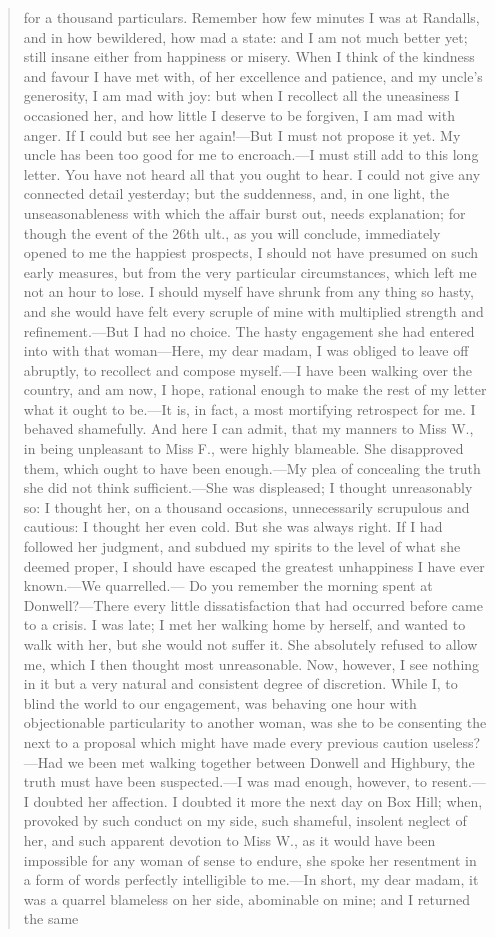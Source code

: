 \begin{quotation}
for a thousand particulars. Remember how few minutes I was at Randalls, and in how bewildered, how mad a state: and I am not much better yet; still insane either from happiness or misery. When I think of the kindness and favour I have met with, of her excellence and patience, and my uncle's generosity, I am mad with joy: but when I recollect all the uneasiness I occasioned her, and how little I deserve to be forgiven, I am mad with anger. If I could but see her again!—But I must not propose it yet. My uncle has been too good for me to encroach.—I must still add to this long letter. You have not heard all that you ought to hear. I could not give any connected detail yesterday; but the suddenness, and, in one light, the unseasonableness with which the affair burst out, needs explanation; for though the event of the 26th ult., as you will conclude, immediately opened to me the happiest prospects, I should not have presumed on such early measures, but from the very particular circumstances, which left me not an hour to lose. I should myself have shrunk from any thing so hasty, and she would have felt every scruple of mine with multiplied strength and refinement.—But I had no choice. The hasty engagement she had entered into with that woman—Here, my dear madam, I was obliged to leave off abruptly, to recollect and compose myself.—I have been walking over the country, and am now, I hope, rational enough to make the rest of my letter what it ought to be.—It is, in fact, a most mortifying retrospect for me. I behaved shamefully. And here I can admit, that my manners to Miss W., in being unpleasant to Miss F., were highly blameable. She disapproved them, which ought to have been enough.—My plea of concealing the truth she did not think sufficient.—She was displeased; I thought unreasonably so: I thought her, on a thousand occasions, unnecessarily scrupulous and cautious: I thought her even cold. But she was always right. If I had followed her judgment, and subdued my spirits to the level of what she deemed proper, I should have escaped the greatest unhappiness I have ever known.—We quarrelled.— Do you remember the morning spent at Donwell?—There every little dissatisfaction that had occurred before came to a crisis. I was late; I met her walking home by herself, and wanted to walk with her, but she would not suffer it. She absolutely refused to allow me, which I then thought most unreasonable. Now, however, I see nothing in it but a very natural and consistent degree of discretion. While I, to blind the world to our engagement, was behaving one hour with objectionable particularity to another woman, was she to be consenting the next to a proposal which might have made every previous caution useless?—Had we been met walking together between Donwell and Highbury, the truth must have been suspected.—I was mad enough, however, to resent.—I doubted her affection. I doubted it more the next day on Box Hill; when, provoked by such conduct on my side, such shameful, insolent neglect of her, and such apparent devotion to Miss W., as it would have been impossible for any woman of sense to endure, she spoke her resentment in a form of words perfectly intelligible to me.—In short, my dear madam, it was a quarrel blameless on her side, abominable on mine; and I returned the same 
\end{quotation}
